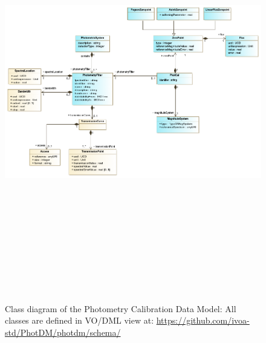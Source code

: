\documentclass[11pt,a4paper]{ivoa}
\begin{document}
\begin{figure}[H]
\includegraphics[angle=90,width=5.98in,height=7.19in]{./schema/PhotometryOverviewDiagram_jan22.png}
\caption{Class diagram of the Photometry Calibration Data Model: All 
classes are defined in VO/DML view at: 
\url{https://github.com/ivoa-std/PhotDM/photdm/schema/}}
\end{figure}


\end{document}
